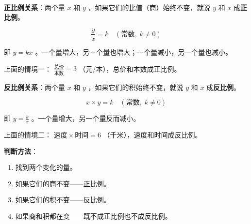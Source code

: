 \begin{understand}


\textbf{正比例关系}：两个量 $x$ 和 $y$ ，如果它们的比值（商）始终不变，就说 $y$ 和 $x$ 成\textbf{正比例}。

\[
\frac{y}{x} = k \quad (\text{常数},\; k \neq 0)
\]


即 $y = kx$ 。一个量增大，另一个量也增大；一个量减小，另一个量也减小。

上面的情境一： $\frac{\text{总价}}{\text{本数}} = 3$ （元/本），总价和本数成正比例。

\textbf{反比例关系}：两个量 $x$ 和 $y$ ，如果它们的积始终不变，就说 $y$ 和 $x$ 成\textbf{反比例}。

\[
x \times y = k \quad (\text{常数},\; k \neq 0)
\]


即 $y = \frac{k}{x}$ 。一个量增大，另一个量反而减小。

上面的情境二： $\text{速度} \times \text{时间} = 6$ （千米），速度和时间成反比例。

\textbf{判断方法}：
\begin{enumerate}
  \item 找到两个变化的量。
  \item 如果它们的商不变——正比例。
  \item 如果它们的积不变——反比例。
  \item 如果商和积都在变——既不成正比例也不成反比例。
\end{enumerate}


\end{understand}

